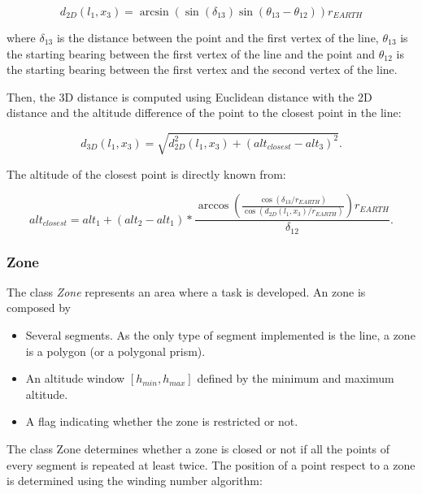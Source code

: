 \begin{equation}
	d_{2D} (l_1,x_3)= \arcsin(\sin({\delta}_{13}) \sin ({\theta}_{13}-{\theta}_{12})) r_{EARTH}
\end{equation}

where ${\delta}_{13}$ is the distance between the point and the first vertex of the line,  ${\theta}_{13}$  is the starting bearing between the first vertex of the line and the point and ${\theta}_{12}$ is the starting bearing between the first vertex and the second vertex of the line.

Then, the 3D distance is computed using Euclidean distance with the 2D distance and the altitude difference of the point to the closest point in the line:

\begin{equation}
	d_{3D} (l_1,x_3)= \sqrt{d_{2D}^2(l_1,x_3)+(alt_{closest}-alt_3)^2}.
\end{equation}

The altitude of the closest point is directly known from:

\begin{equation}
	alt_{closest}=alt_1 + (alt_2-alt_1)*\frac{\arccos(\frac{\cos({\delta}_{13}/r_{EARTH})}{\cos(d_{2D}(l_1,x_3)/r_{EARTH})})r_{EARTH}}{{\delta}_{12}}.
\end{equation}


\subsubsection{Zone}
The class \textit{Zone} represents an area where a task is developed. An zone is composed by

\begin{itemize}

\item Several segments. As the only type of segment implemented is the line, a zone is a polygon (or a polygonal prism).

\item An altitude window $[h_{min},h_{max}]$ defined by the minimum and maximum altitude.

\item A flag indicating whether the zone is restricted or not. 

\end{itemize}

The class Zone determines whether a zone is closed or not if all the points of every segment is repeated at least twice. The position of a point respect to a zone is determined using the winding number algorithm:

